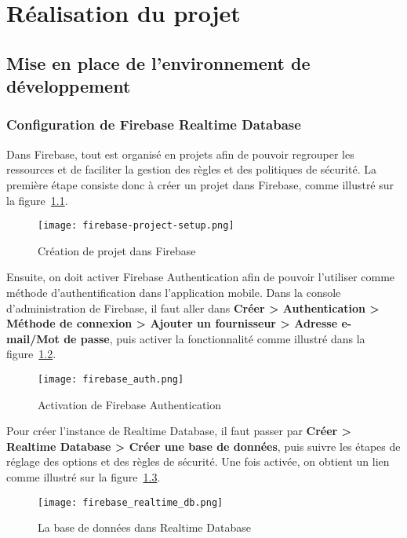 \pagestyle{fancy}
\fancyhead{} %

\chapter{Réalisation du projet}
\section{Mise en place de l'environnement de développement}
\subsection{Configuration de Firebase Realtime Database}
Dans Firebase, tout est organisé en projets afin de pouvoir regrouper les ressources et de faciliter la gestion des règles et des politiques de sécurité. La première étape consiste donc à créer un projet dans Firebase, comme illustré sur la figure~\ref{fig:creation_projet_dans_firebase}.

\begin{figure}[H]
   \centering
   \texttt{[image: firebase-project-setup.png]}
   \caption{Création de projet dans Firebase}
   \label{fig:creation_projet_dans_firebase}
\end{figure}

Ensuite, on doit activer Firebase Authentication afin de pouvoir l'utiliser comme méthode d'authentification dans l'application mobile. Dans la console d'administration de Firebase, il faut aller dans \textbf{Créer > Authentication > Méthode de connexion > Ajouter un fournisseur > Adresse e-mail/Mot de passe}, puis activer la fonctionnalité comme illustré dans la figure~\ref{fig:activation_de_Firebase_Auth}.

\begin{figure}[H]
   \centering
   \texttt{[image: firebase\_auth.png]}
   \caption{Activation de Firebase Authentication}
   \label{fig:activation_de_Firebase_Auth}
\end{figure}

Pour créer l'instance de Realtime Database, il faut passer par \textbf{Créer > Realtime Database > Créer une base de données}, puis suivre les étapes de réglage des options et des règles de sécurité. Une fois activée, on obtient un lien comme illustré sur la figure~\ref{fig:db_dans_realtime_db}. 

\begin{figure}[H]
   \centering
   \texttt{[image: firebase\_realtime\_db.png]}
   \caption{La base de données dans Realtime Database}
   \label{fig:db_dans_realtime_db}
\end{figure}


